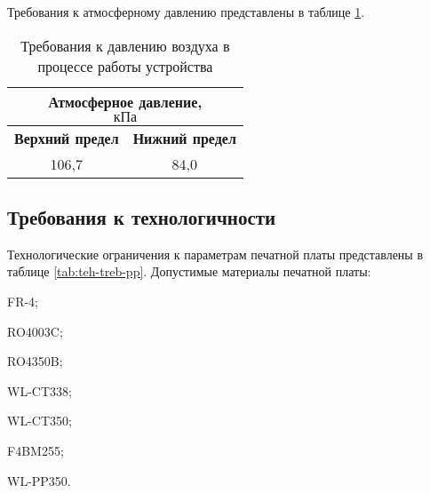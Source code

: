 Требования к атмосферному давлению представлены в таблице \ref{tab:treb-davl}.

\begin{table}[H]
    \centering
    \begin{tabular}{|c|c|}
    \hline
        \multicolumn{2}{|c|}{\textbf{Атмосферное давление, \[кПа\]}}  \\ \hline
        \textbf{Верхний предел} & \textbf{Нижний предел} \\ \hline
        106,7 & 84,0 \\ \hline
    \end{tabular}
    \caption{Требования к давлению воздуха в процессе работы устройства}
    \label{tab:treb-davl}
\end{table}

\subsection{Требования к технологичности}

Технологические ограничения к параметрам печатной платы представлены в таблице \ref{tab:teh-treb-pp}. Допустимые материалы печатной платы:




\begin{itemize}
    \begin{minipage}{.30\textwidth}
        \item FR-4;
        \item RO4003C;
        \item RO4350B;
        \item WL-CT338;
    \end{minipage}
    \begin{minipage}{.30\textwidth}
        \item WL-CT350;
        \item F4BM255;
        \item WL-PP350.
    \end{minipage}
\end{itemize}






